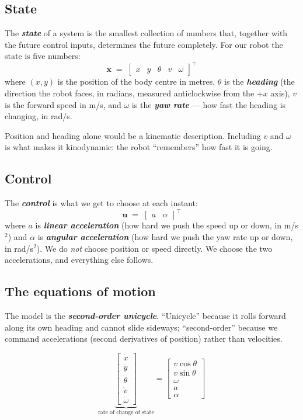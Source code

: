 \documentclass[11pt,a4paper]{article}
\newcommand{\defn}[1]{\textbf{\textit{#1}}}
\begin{document}
\subsection{State}

The \defn{state} of a system is the smallest collection of numbers that, together with the
future control inputs, determines the future completely. For our robot the state is five
numbers:
\[
\mathbf{x} \;=\; \begin{bmatrix} x & y & \theta & v & \omega \end{bmatrix}^{\!\top}
\]
where $(x,y)$ is the position of the body centre in metres, $\theta$ is the
\defn{heading} (the direction the robot faces, in radians, measured anticlockwise from the
$+x$ axis), $v$ is the forward speed in m/s, and $\omega$ is the \defn{yaw rate} --- how
fast the heading is changing, in rad/s.

Position and heading alone would be a kinematic description. Including $v$ and $\omega$ is
what makes it kinodynamic: the robot ``remembers'' how fast it is going.

\subsection{Control}

The \defn{control} is what we get to choose at each instant:
\[
\mathbf{u} \;=\; \begin{bmatrix} a & \alpha \end{bmatrix}^{\!\top}
\]
where $a$ is \defn{linear acceleration} (how hard we push the speed up or down, in
m/s$^2$) and $\alpha$ is \defn{angular acceleration} (how hard we push the yaw rate up or
down, in rad/s$^2$). We do \emph{not} choose position or speed directly. We choose the two
accelerations, and everything else follows.

\subsection{The equations of motion}

The model is the \defn{second-order unicycle}. ``Unicycle'' because it rolls forward along
its own heading and cannot slide sideways; ``second-order'' because we command
accelerations (second derivatives of position) rather than velocities.

\begin{equation}
\underbrace{
\begin{bmatrix}\dot{x}\\ \dot{y}\\ \dot{\theta}\\ \dot{v}\\ \dot{\omega}\end{bmatrix}
}_{\text{rate of change of state}}
=
\begin{bmatrix}
v\cos\theta \\ v\sin\theta \\ \omega \\ a \\ \alpha
\end{bmatrix}
\label{eq:dyn}
\end{equation}
\end{document}
